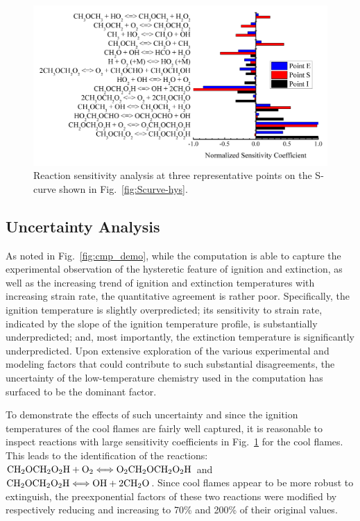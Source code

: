 \begin{figure}[t]
  \centering
  \scriptsize
  \includegraphics[width=1.0\textwidth]{ch-NTC/SA.png}
  \normalsize
  \caption{Reaction sensitivity analysis at three representative points on the S-curve shown in Fig.~\ref{fig:Scurve-hys}.}
  \label{fig:NTC-SA}
\end{figure}

\subsection{Uncertainty Analysis}\label{sec:NTC-uncertainty}

As noted in Fig.~\ref{fig:cmp_demo}, while the computation is able to capture the experimental observation of the hysteretic feature of ignition and extinction, as well as the increasing trend of ignition and extinction temperatures with increasing strain rate, the quantitative agreement is rather poor.  Specifically, the ignition temperature is slightly overpredicted; its sensitivity to strain rate, indicated by the slope of the ignition temperature profile, is substantially underpredicted; and, most importantly, the extinction temperature is significantly underpredicted. Upon extensive exploration of the various experimental and modeling factors that could contribute to such substantial disagreements, the uncertainty of the low-temperature chemistry used in the computation has surfaced to be the dominant factor.

To demonstrate the effects of such uncertainty and since the ignition temperatures of the cool flames are fairly well captured, it is reasonable to inspect reactions with large sensitivity coefficients in Fig.~\ref{fig:NTC-SA} for the cool flames.  This leads to the identification of the reactions: $\rm{CH}_2\rm{OCH}_2\rm{O}_2\rm{H} + \rm{O}_2 \Longleftrightarrow \rm{O}_2\rm{CH}_2\rm{OCH}_2\rm{O}_2\rm{H}$ and $\rm{CH}_2\rm{OCH}_2\rm{O}_2\rm{H} \Longleftrightarrow \rm{OH} + 2\rm{CH}_2\rm{O}$.  Since cool flames appear to be more robust to extinguish, the preexponential factors of these two reactions were modified by respectively reducing and increasing to 70\% and 200\% of their original values.

